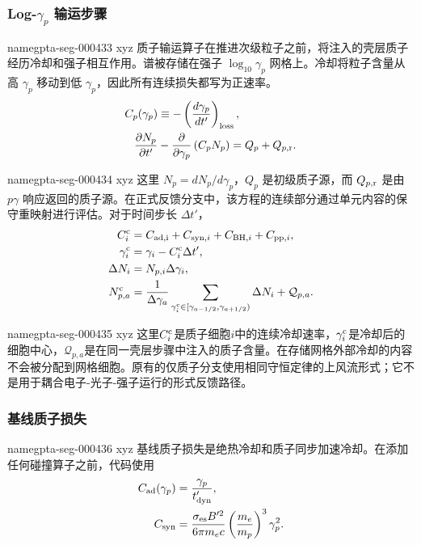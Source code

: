 \documentclass[twocolumn]{aastex702}
\makeatletter
\providecommand{\gptareaderanchor}[1]{\pdfdest name{#1} xyz}%
\providecommand{\gptareaderanchor}[1]{\special{pdf:dest (#1) [ @thispage /XYZ @xpos @ypos null ]}}%
\makeatother
\begin{document}
\subsubsection{\texorpdfstring{Log-\(\gamma_p\)}{Log-gamma-p} 输运步骤}


\gptareaderanchor{gpta-seg-000433}%
质子输运算子在推进次级粒子之前，将注入的壳层质子经历冷却和强子相互作用。谱被存储在强子 \(\log_{10}\gamma_p\) 网格上。冷却将粒子含量从高 \(\gamma_p\) 移动到低 \(\gamma_p\)，因此所有连续损失都写为正速率。
\begin{equation}
\begin{aligned}
C_p(\gamma_p)&\equiv
-\left(\frac{d\gamma_p}{dt'}\right)_{\rm loss},\\
\frac{\partial N_p}{\partial t'}
&-\frac{\partial}{\partial\gamma_p}
\left(C_pN_p\right)
=Q_p+Q_{p,{\rm r}} .
\end{aligned}
\end{equation}

\gptareaderanchor{gpta-seg-000434}%
这里 \(N_p=dN_p/d\gamma_p\)，\(Q_p\) 是初级质子源，而 \(Q_{p,{\rm r}}\) 是由 \(p\gamma\) 响应返回的质子源。在正式反馈分支中，该方程的连续部分通过单元内容的保守重映射进行评估。对于时间步长 \(\Delta t'\)，
\begin{equation}
\begin{aligned}
C_i^{\rm c} &=
C_{\rm ad,i}+C_{{\rm syn},i}+C_{{\rm BH},i}+C_{{\rm pp},i},\\
\gamma_i^{\rm c} &= \gamma_i-C_i^{\rm c}\Delta t',\\
\Delta N_i &= N_{p,i}\Delta\gamma_i,\\
N_{p,a}^{\rm c} &=
\frac{1}{\Delta\gamma_a}
\sum_{\gamma_i^{\rm c}\in[\gamma_{a-1/2},\gamma_{a+1/2})}\Delta N_i
+\mathcal{Q}_{p,a}.
\end{aligned}
\end{equation}

\gptareaderanchor{gpta-seg-000435}%
这里\(C_i^{\rm c}\)是质子细胞\(i\)中的连续冷却速率，\(\gamma_i^{\rm c}\)是冷却后的细胞中心，\(\mathcal{Q}_{p,a}\)是在同一壳层步骤中注入的质子含量。在存储网格外部冷却的内容不会被分配到网格细胞。原有的仅质子分支使用相同守恒定律的上风流形式；它不是用于耦合电子-光子-强子运行的形式反馈路径。

\subsubsection{基线质子损失}


\gptareaderanchor{gpta-seg-000436}%
基线质子损失是绝热冷却和质子同步加速冷却。在添加任何碰撞算子之前，代码使用
\begin{equation}
\begin{aligned}
C_{\rm ad}(\gamma_p)&=\frac{\gamma_p}{t'_{\rm dyn}},\\
C_{\rm syn}&=
\frac{\sigma_{\rm es} B'^2}{6\pi m_ec}
\left(\frac{m_e}{m_p}\right)^3\gamma_p^2.
\end{aligned}
\end{equation}
\end{document}
